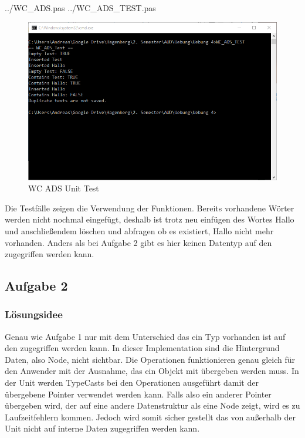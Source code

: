 \documentclass[a4papr,12pt]{article}
\begin{document}
 {../WC_ADS.pas}
 {../WC_ADS_TEST.pas}
\begin{figure}[H]
	\centering
	\includegraphics[scale=0.8]{./pictures/1.png}
	\caption{WC ADS Unit Test }
	\label{fig: WC_ADS Unit}
\end{figure}
\raggedright
Die Testfälle zeigen die Verwendung der Funktionen. Bereits vorhandene Wörter werden nicht nochmal eingefügt, deshalb ist trotz neu einfügen des Wortes \grqq{}Hallo\grqq{} und anschließendem löschen und abfragen ob es existiert, \grqq{}Hallo\grqq{} nicht mehr vorhanden. Anders als bei Aufgabe 2 gibt es hier keinen Datentyp auf den zugegriffen werden kann. 

\newpage
\subsection*{Aufgabe 2}
\subsubsection*{Lösungsidee}
Genau wie Aufgabe 1 nur mit dem Unterschied das ein Typ vorhanden ist auf den zugegriffen werden kann. In dieser Implementation sind die Hintergrund Daten, also \grqq{}Node\grqq{}, nicht sichtbar. Die Operationen funktionieren genau gleich für den Anwender mit der Ausnahme, das ein Objekt mit übergeben werden muss. In der Unit werden TypeCasts bei den Operationen ausgeführt damit der übergebene Pointer verwendet werden kann. Falls also ein anderer Pointer übergeben wird, der auf eine andere Datenstruktur als eine Node zeigt, wird es zu Laufzeitfehlern kommen. Jedoch wird somit sicher gestellt das von außerhalb der Unit nicht auf interne Daten zugegriffen werden kann.
\newline
\end{document}

